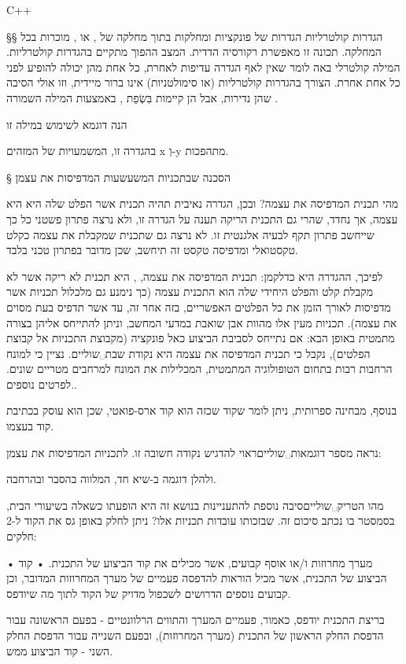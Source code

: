 {C++}

§§ הגדרות קולטרליות
הגדרות של פונקציות ומחלקות בתוך מחלקה של , או , מוכרות בכל המחלקה.
תכונה זו מאפשרת רקורסיה הדדית. המצב ההפוך מתקיים בהגדרות קולטרליות. המילה
קולטרלי באה לומר שאין לאף הגדרה עדיפות לאחרת, כל אחת מהן יכולה להופיע לפני כל
אחת אחרת. הצורך בהגדרות קולטרליות (או סימולטניות) אינו ברור מיידית, וזו אולי
הסיבה שהן נדירות, אבל הן קיימות בִּשְׂפַת , באמצעות המילה השמורה .

הנה דוגמא לשימוש במילה זו
\begin{center}
\end{center}

בהגדרה זו, המשמעויות של המזהים x וְ-y מתהפכות.

§ הסכנה שבתכניות המשעשעות המדפיסות את עצמן

מהי תכנית המדפיסה את עצמה? ובכן, הגדרה נאיבית תהיה תכנית אשר הפלט שלה היא היא
עצמה, אך נחדד, שהרי גם התכנית הריקה תענה על הגדרה זו, ולא נרצה פתרון פשטני כל
כך שייחשב פתרון תקף לבעיה אלגנטית זו. לא נרצה גם שתכנית שמקבלת את עצמה כקלט
טקסטואלי ומדפיסה טקסט זה תיחשב, שכן מדובר בפתרון טכני בלבד.

לפיכך, ההגדרה היא כדלקמן: תכנית המדפיסה את עצמה, , היא תכנית לא ריקה
אשר לא מקבלת קלט והפלט היחידי שלה הוא התכנית עצמה (כך נימנע גם מלכלול תכניות
אשר מדפיסות לאורך הזמן את כל הפלטים האפשריים, בזה אחר זה, עד אשר תדפיס בעת
מסוים את עצמה). תכניות מעין אלו מהוות אבן שואבת במדעי המחשב, וניתן להתייחס
אליהן בצורה מתמטית באופן הבא: אם נתייחס לסביבת הביצוע כאל פונקציה (מקבוצת
התכניות אל קבוצת הפלטים), נקבל כי תכנית המדפיסה את עצמה היא נקודת
שבת␣שוליים{. נציין כי למונח הרחבות רבות בתחום הטופולוגיה
המתמטית, המכלילות את המונח למרחבים מטריים שונים. לפרטים נוספים.}.

בנוסף, מבחינה ספרותית, ניתן לומר שקוד שכזה הוא קוד ארס-פואטי, שכן הוא עוסק
בכתיבת קוד בעצמו.

נראה מספר דוגמאות␣שוליים{ראוי להדגיש נקודה חשובה זו.} לתכניות המדפיסות את עצמן:





ולהלן דוגמה ב-שיא חד, המלווה בהסבר ובהרחבה.

מהו הטריק␣שוליים{סיבה נוספת להתעניינות בנושא זה היא הופעתו כשאלה בשיעורי הבית, בסמסטר בו נכתב סיכום זה.} שבזכותו עובדות תכניות אלו? ניתן לחלק באופן גס את הקוד ל-2 חלקים:
\begin{enumerate}
• מערך מחרוזות ו/או אוסף קבועים, אשר מכילים את קוד הביצוע של התכנית.
• קוד הביצוע של התכנית, אשר מכיל הוראות להדפסה פעמיים של מערך המחרוזות המדובר, וכן קבועים נוספים הדרושים לשכפול מדויק של הקוד לתוך מה שיודפס.
\end{enumerate}
בריצת התכנית יודפס, כאמור, פעמיים המערך והתווים הרלוונטיים - בפעם הראשונה עבור הדפסת החלק הראשון של התכנית (מערך המחרוזות), ובפעם השנייה עבור הדפסת החלק השני - קוד הביצוע ממש.

